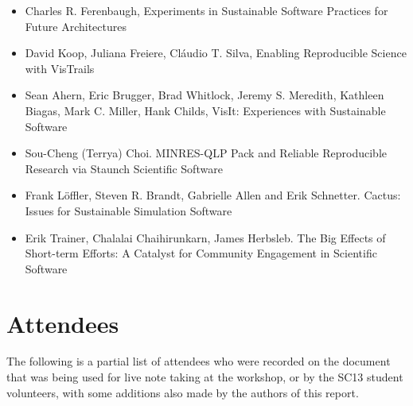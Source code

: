 \documentclass[11pt, oneside]{amsart}
\newcommand{\note}[1]{ {\textcolor{red}    { #1 }}}
\begin{document}
\begin{itemize}

\item Charles R. Ferenbaugh, Experiments in Sustainable Software
  Practices for Future Architectures~\cite{Ferenbaugh_WSSSPE}

\item David Koop, Juliana Freiere, Cl\'{a}udio T. Silva, Enabling
  Reproducible Science with VisTrails~\cite{Koop_WSSSPE}

\item Sean Ahern, Eric Brugger, Brad Whitlock, Jeremy S. Meredith,
  Kathleen Biagas, Mark C. Miller, Hank Childs, VisIt: Experiences
  with Sustainable Software~\cite{Ahern_WSSSPE}

\item Sou-Cheng (Terrya) Choi. MINRES-QLP Pack and Reliable
  Reproducible Research via Staunch Scientific Software~\cite{Choi_WSSSPE}

\item Frank L\"{o}ffler, Steven R. Brandt, Gabrielle Allen and Erik
  Schnetter. Cactus: Issues for Sustainable Simulation
  Software~\cite{Loffler_WSSSPE}

\item Erik Trainer, Chalalai Chaihirunkarn, James Herbsleb. The Big
  Effects of Short-term Efforts: A Catalyst for Community Engagement
  in Scientific Software~\cite{Trainer_WSSSPE}
  


\end{itemize}



\section{Attendees} \label{sec:attendees}  %


The following is a partial list of attendees who were recorded on the
document~\cite{WSSSPE1-google-notes} that was being used for live note
taking at the workshop, or by the SC13 student volunteers, with some
additions also made by the authors of this report.
\end{document}
